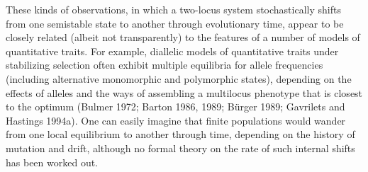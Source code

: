 \documentclass{article}
\begin{document}
These kinds of observations, in which a two-locus system stochastically shifts from one semistable state to another through evolutionary time, appear to be closely related (albeit not transparently) to the features of a number of models of quantitative traits. For example, diallelic models of quantitative traits under stabilizing selection often exhibit multiple equilibria for allele frequencies (including alternative monomorphic and polymorphic states), depending on the effects of alleles and the ways of assembling a multilocus phenotype that is closest to the optimum (Bulmer 1972; Barton 1986, 1989; Bürger 1989; Gavrilets and Hastings 1994a). One can easily imagine that finite populations would wander from one local equilibrium to another through time, depending on the history of mutation and drift, although no formal theory on the rate of such internal shifts has been worked out.
\end{document}
